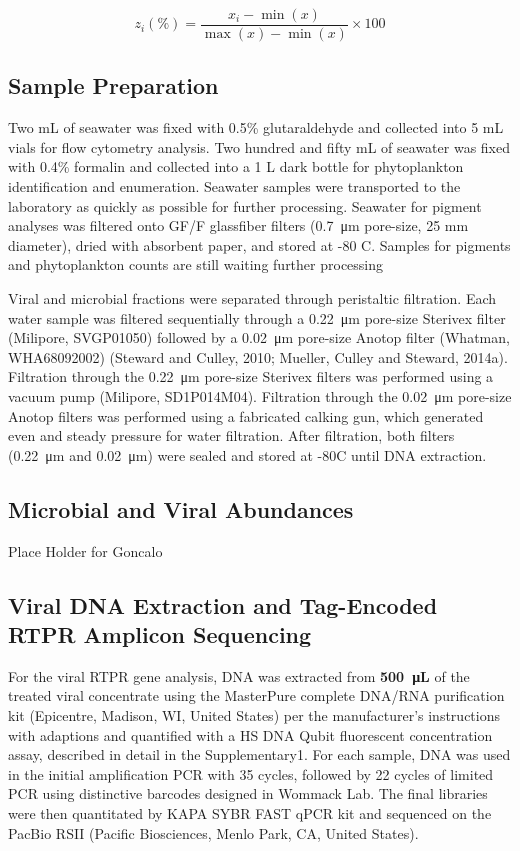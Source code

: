 \documentclass[a4,center,fleqn]{NAR}
\begin{document}
\begin{equation}
  z_{i}(\%)=\frac{x_{i}-\min (x)}{\max (x)-\min (x)} \times 100
  \label{equation1}
\end{equation}


\subsection{Sample Preparation}

Two mL of seawater was fixed with 0.5\% glutaraldehyde and collected into 5 mL vials for flow cytometry analysis.
Two hundred and fifty mL of seawater was fixed with 0.4\% formalin and collected into a 1 L dark bottle for phytoplankton identification and enumeration.
Seawater samples were transported to the laboratory as quickly as possible for further processing. 
Seawater for pigment analyses was filtered onto GF/F glassfiber filters (\SI{0.7}{\micro\metre} pore-size, 25 mm diameter), dried with absorbent paper, and stored at -80 \degree C. 
Samples for pigments and phytoplankton counts are still waiting further processing

Viral and microbial fractions were separated through peristaltic filtration.
Each water sample was filtered sequentially through a \SI{0.22}{\micro\metre} pore-size Sterivex filter (Milipore, SVGP01050) followed by a \SI{0.02}{\micro\metre} pore-size Anotop filter (Whatman, WHA68092002) (Steward and Culley, 2010; Mueller, Culley and Steward, 2014a).
Filtration through the \SI{0.22}{\micro\metre} pore-size Sterivex filters was performed using a vacuum pump (Milipore, SD1P014M04). 
Filtration through the \SI{0.02}{\micro\metre} pore-size Anotop filters was performed using a fabricated calking gun, which generated even and steady pressure for water filtration.
After filtration, both filters (\SI{0.22}{\micro\metre} and \SI{0.02}{\micro\metre}) were sealed and stored at -80\degree C until DNA extraction. 

\subsection{Microbial and Viral Abundances}

Place Holder for Goncalo

\subsection{Viral DNA Extraction and Tag-Encoded RTPR Amplicon Sequencing}

For the viral RTPR gene analysis, DNA was extracted from \textbf{\SI{500}{\micro\liter}} of the treated viral concentrate using the MasterPure complete DNA/RNA purification kit (Epicentre,  Madison, WI, United States) per the manufacturer’s instructions with adaptions and quantified with a HS DNA Qubit fluorescent concentration assay, described in detail in the Supplementary1. 
For each sample, DNA was used in the initial amplification PCR with 35 cycles, followed by 22 cycles of limited PCR using distinctive barcodes designed in Wommack Lab. 
The final libraries were then quantitated by KAPA SYBR FAST qPCR kit and sequenced on the PacBio RSII (Pacific Biosciences, Menlo Park, CA, United States).
\end{document}

